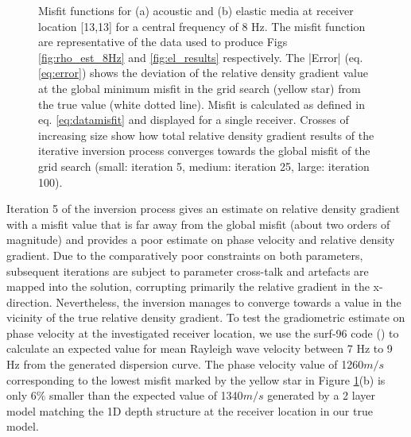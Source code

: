 \documentclass[]{article}
\begin{document}
\begin{figure}[H]
\begin{subfigure}[c]{0.6\textwidth}
	 	\end{subfigure}
	 	\caption{Misfit functions for (a) acoustic and (b) elastic media at receiver location [13,13] for a central frequency of 8 Hz. The misfit function are representative of the data used to produce Figs \ref{fig:rho_est_8Hz} and \ref{fig:el_results} respectively. The |Error| (eq. \ref{eq:error}) shows the deviation of the relative density gradient value at the global minimum misfit in the grid search (yellow star) from the true value (white dotted line). Misfit is calculated as defined in eq. \eqref{eq:datamisfit} and displayed for a single receiver. Crosses of increasing size show how total relative density gradient results of the iterative inversion process converges towards the global misfit of the grid search (small: iteration 5, medium: iteration 25, large: iteration 100).}%
	 	\label{fig:misfit_recLOC_main}
	 \end{figure}
 
	Iteration 5 of the inversion process gives an estimate on relative density gradient with a misfit value that is far away from the global misfit (about two orders of magnitude) and provides a poor estimate on phase velocity and relative density gradient. Due to the comparatively poor constraints on both parameters, subsequent iterations are subject to parameter cross-talk and artefacts are mapped into the solution, corrupting primarily the relative gradient in the x-direction. Nevertheless, the inversion manages to converge towards a value in the vicinity of the true relative density gradient. To test the gradiometric estimate on phase velocity at the investigated receiver location, we use the surf-96 code (\cite{herrman84computer}) to calculate an expected value for mean Rayleigh wave velocity between 7 Hz to 9 Hz from the generated dispersion curve. The phase velocity value of 1260$m/s$ corresponding to the lowest misfit marked by the yellow star in Figure \ref{fig:misfit_recLOC_main}(b) is only 6$\%$ smaller than the expected value of 1340$m/s$ generated by a 2 layer model matching the 1D depth structure at the receiver location in our true model. \\%
	
\end{document}

